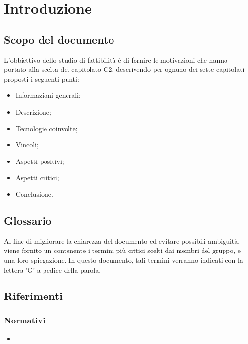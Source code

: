 \section{Introduzione}

\subsection{Scopo del documento}
L'obbiettivo dello studio di fattibilità è di fornire le motivazioni che hanno portato alla scelta del capitolato C2, descrivendo per ognuno dei sette capitolati proposti i seguenti punti:
\begin{itemize}
\item Informazioni generali;
\item Descrizione;
\item Tecnologie coinvolte;
\item Vincoli;
\item Aspetti positivi;
\item Aspetti critici;
\item Conclusione.
\end{itemize}

\subsection{Glossario}
Al fine di migliorare la chiarezza del documento ed evitare possibili ambiguità, viene fornito un \Glossario{} contenente i termini più critici scelti dai membri del gruppo, e una loro spiegazione. In questo documento, tali termini verranno indicati con la lettera 'G' a pedice della parola. 

\subsection{Riferimenti}
\subsubsection{Normativi}
\begin{itemize}
\item {}
\end{itemize}

